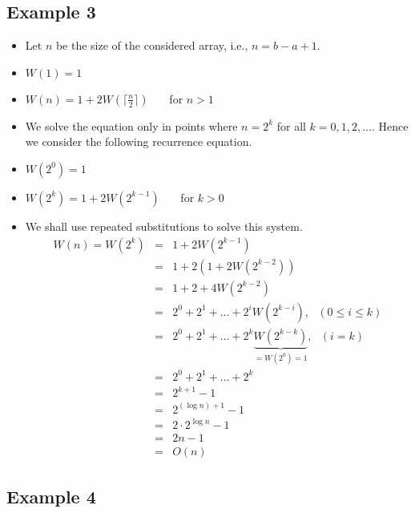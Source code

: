 \documentclass[english]{article}
\begin{document}
\newpage
\subsection*{Example 3}
\begin{itemize}
\item Let $n$ be the size of the considered array, i.e., $n = b-a+1$.
\item[] $W(1)=1$
\item[] $W(n)= 1 + 2W(\lceil \frac{n}{2} \rceil)$ \ \ \ for $n>1$
\item We solve the equation only in points where $n=2^k$
      for all $k = 0, 1, 2, \ldots$. Hence we consider the following 
      recurrence equation.
     
\item[] $W(2^0)=1$
\item[] $W(2^k)= 1 + 2W(2^{k-1})$ \ \ \ for $k>0$

\item We shall use repeated substitutions to solve this system.
 \begin{eqnarray*}
      W(n) = W(2^k) &=& 1 +2W(2^{k-1}) \\
			    &=& 1 +2(1+2W(2^{k-2}))\\
				&=& 1 +2 +4W(2^{k-2})\\
				&=& 2^0 + 2^1 + \ldots + 2^{i}W(2^{k-i}), \ \ \
(0\leq i\leq k)\\
				&=& 2^0 + 2^1 + \ldots + 2^{k}\underbrace{W(2^{k-k})}_{= W(2^0) = 1}, \ \ \
(i=k) \\
				&=& 2^0 + 2^1 + \ldots + 2^{k} \\
				&=& 2^{k+1}-1\\
				&=& 2^{(\log n)+1}-1\\
				&=& 2 \cdot 2^{\log n} - 1\\
				&=& 2n-1\\
				&=& O(n)
        \end{eqnarray*}
\end{itemize}

\subsection*{Example 4}
\begin{algorithmic}
   \ELSE
   \ENDIF
 \ENDWHILE
 \STATE{}
 \STATE{}
  \STATE{OK:=true; \  $i:=1$}
  \ELSE {} 
   \STATE{OK := false} 
  \ENDIF
  \ENDIF
  \ENDIF
  \ENDWHILE 
  \ELSE
  \ENDIF
\end{algorithmic}
\end{document}

